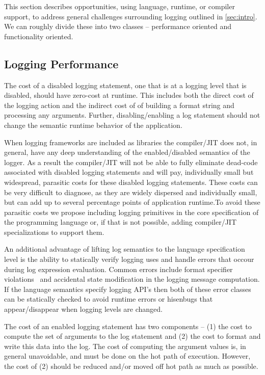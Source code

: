 This section describes opportunities, using language, runtime, or compiler support, to address 
general challenges surrounding logging outlined in \autoref{sec:intro}. We can roughly divide 
these into two classes -- performance oriented and functionality oriented. 

\subsection{Logging Performance}
\label{subsec:performancedesign}

\begin{design}
The cost of a disabled logging statement, one that is at a logging level that 
is disabled, should have zero-cost at runtime. This includes both the direct 
cost of the logging action and the indirect cost of of building a format 
string and processing any arguments. Further, disabling/enabling a log 
statement should not change the semantic runtime behavior of the application.
\end{design}

When logging frameworks are included as libraries the compiler/JIT does not, 
in general, have any deep understanding of the enabled/disabled semantics of 
the logger. As a result the compiler/JIT will not be able to fully eliminate 
dead-code associated with disabled logging statements and will pay, individually 
small but widespread, parasitic costs for these disabled logging statements. 
These costs can be very difficult to diagnose, as they are widely dispersed and 
individually small, but can add up to several percentage points of application 
runtime.To avoid these parasitic costs we propose including logging primitives 
in the core specification of the programming language or, if that is not possible, 
adding compiler/JIT specializations to support them. 

An additional advantage of lifting log semantics to the language specification 
level is the ability to statically verify logging uses and handle errors that 
occour during log expression evaluation. Common errors include 
format specifier violations~\cite{tyepcheckprintf} and accidental state 
modification in the logging message computation. If the language semantics 
specify logging API's then both of these error classes can be statically 
checked to avoid runtime errors or hisenbugs that appear/disappear when logging 
levels are changed.

\begin{design}
The cost of an enabled logging statement has two components -- (1) the cost to 
compute the set of arguments to the log statement and (2) the cost to format and 
write this data into the log. The cost of computing the argument values is, in 
general unavoidable, and must be done on the hot path of execution. However, 
the cost of (2) should be reduced and/or moved off hot path as much as possible.
\end{design}

